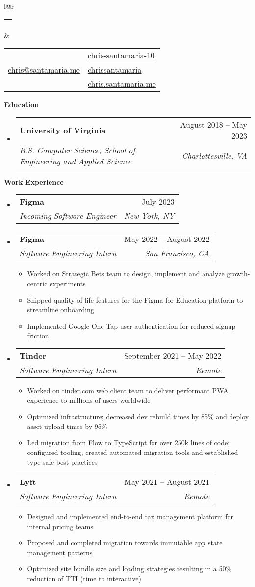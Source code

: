 \documentclass[letterpaper,12pt]{article}[leftmargin=*]
\makeatletter
\def \fullname {Chris Santamaria}
\def \linkedinicon {\faLinkedinSquare}
\def \linkedinlink {https://www.linkedin.com/in/chris-santamaria-10}
\def \linkedintext {chris-santamaria-10}
\def \phoneicon {\faPhone}
\def \phonetext {(813) 545-5164}
\def \emailicon {\faEnvelope}
\def \emaillink {mailto:chris@santamaria.me}
\def \emailtext {chris@santamaria.me}
\def \locationicon {\faMapMarker}
\def \locationtext {Saint Petersburg, FL}
\def \githubicon {\faGithub}
\def \githublink {https://github.com/chrissantamaria}
\def \githubtext {chrissantamaria}
\def \websiteicon {\faGlobe}
\def \websitelink {https://chris.santamaria.me}
\def \websitetext {chris.santamaria.me}
\def \headertype {\doublecol} %
\def \entryspacing {-0pt}
\def \linkedin {\linkedinicon \hspace{3pt}\href{\linkedinlink}{\linkedintext}}
\def \phone {\phoneicon \hspace{3pt}{ \phonetext}}
\def \email {\emailicon \hspace{4pt}\href{\emaillink}{\emailtext}}
\def \location {\hspace{0pt} \locationicon \hspace{2pt}{ \locationtext}}
\def \github {\githubicon \hspace{3pt}\href{\githublink}{\githubtext}}
\def \website {\websiteicon \hspace{3pt}\href{\websitelink}{\websitetext}}
\renewcommand{\section}[2]{\vspace{5pt}
  \colorbox{secondary}{\color{white}\raggedbottom\normalsize\textbf{{#1}{\hspace{7pt}#2}}}
}
\newcommand{\resumeEntryStart}{\begin{itemize}[leftmargin=2.5mm]}
\newcommand{\resumeEntryEnd}{\end{itemize}\vspace{\entryspacing}}
\newcommand{\resumeItemListStart}{\begin{itemize}[leftmargin=4.5mm]}
\newcommand{\resumeItemListEnd}{\end{itemize}}
\newcommand{\resumeItem}[1]{
  \item\small{
    {#1 \vspace{-2pt}}
  }
}
\newcommand{\resumeEntryTSDL}[4]{
  \vspace{-1pt}\item[]
    \begin{tabular*}{0.97\textwidth}{l@{\extracolsep{\fill}}r}
      \textbf{\color{primary}#1} & {\firabook\color{accent}\small#2} \\
      \textit{\color{accent}\small#3} & \textit{\color{accent}\small#4} \\
    \end{tabular*}\vspace{-7pt}
}
\newcommand{\doublecol}[6]{
  \begin{tabular*}{\textwidth}{l@{\extracolsep{\fill}}r}
    {
      \begin{tabular}[c]{l}
        \fontsize{35}{45}\selectfont{\color{primary}{{\textbf{\fullname}}}}
      \end{tabular}
    } & {
      \begin{tabular}[c]{l@{\hspace{1.5em}}l}
        {\small#4} & {\small#1} \\
        {\small#5} & {\small#2} \\
        {\small#6} & {\small#3}
      \end{tabular}
    }
  \end{tabular*}
}
\newcommand{\singlecol}[6]{
  \begin{tabular*}{\textwidth}{l@{\extracolsep{\fill}}r}
    {
      \begin{tabular}[b]{l}
        \fontsize{35}{45}\selectfont{\color{primary}{{\textbf{\fullname}}}} \\
        {\textit{\subtitle}} %
      \end{tabular}
    } & {
      \begin{tabular}[c]{l}
        {\small#1} \\
        {\small#2} \\
        {\small#3} \\
        {\small#4} \\
        {\small#5} \\
        {\small#6}
      \end{tabular}
    }
  \end{tabular*}
}
\makeatother
\begin{document}
\headertype
{\linkedin}
{\github}
{\website}
{\phone}
{\email}
{\location}
\vspace{0pt} %

\section{\faGraduationCap}{Education}

\resumeEntryStart
\resumeEntryTSDL
{University of Virginia}
{August 2018 -- May 2023}
{B.S. Computer Science, School of Engineering and Applied Science}{Charlottesville, VA}
\resumeEntryEnd

\section{\faCode}{Work Experience}

\resumeEntryStart
\resumeEntryTSDL
{Figma}
{July 2023}
{Incoming Software Engineer}
{New York, NY}
\resumeEntryEnd

\resumeEntryStart
\resumeEntryTSDL
{Figma}
{May 2022 -- August 2022}
{Software Engineering Intern}
{San Francisco, CA}
\resumeItemListStart
\resumeItem {Worked on Strategic Bets team to design, implement and analyze growth-centric experiments}
\resumeItem {Shipped quality-of-life features for the Figma for Education platform to streamline onboarding}
\resumeItem {Implemented Google One Tap user authentication for reduced signup friction}
\resumeItemListEnd
\resumeEntryEnd

\resumeEntryStart
\resumeEntryTSDL
{Tinder}
{September 2021 -- May 2022}
{Software Engineering Intern}
{Remote}
\resumeItemListStart
\resumeItem {Worked on tinder.com web client team to deliver performant PWA experience to millions of users worldwide}
\resumeItem {Optimized infrastructure; decreased dev rebuild times by 85\% and deploy asset upload times by 95\%}
\resumeItem {Led migration from Flow to TypeScript for over 250k lines of code; configured tooling, created automated migration tools and established type-safe best practices}
\resumeItemListEnd
\resumeEntryEnd

\resumeEntryStart
\resumeEntryTSDL
{Lyft}
{May 2021 -- August 2021}
{Software Engineering Intern}
{Remote}
\resumeItemListStart
\resumeItem {Designed and implemented end-to-end tax management platform for internal pricing teams}
\resumeItem {Proposed and completed migration towards immutable app state management patterns}
\resumeItem {Optimized site bundle size and loading strategies resulting in a 50\% reduction of TTI (time to interactive)}
\resumeItemListEnd
\resumeEntryEnd
\end{document}
